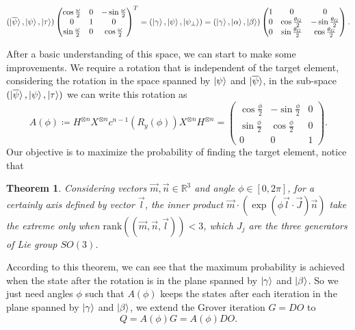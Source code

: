 \documentclass[a4paper,10pt]{book}
\newtheorem{theorem}{Theorem}[section]
\numberwithin{equation}{section}
\begin{document}
\begin{equation*}
    (\ket{\overline{\psi}},\ket{\psi},\ket{\tau})
    \begin{pmatrix}
        \cos\frac{\omega}{2} & 0 & -\sin\frac{\omega}{2} \\
        0                    & 1 & 0                     \\
        \sin\frac{\omega}{2} & 0 & \cos\frac{\omega}{2}
    \end{pmatrix}
    ^{T}=(\ket{\gamma},\ket{\psi},\ket{\psi_{\perp}})
    =(\ket{\gamma},\ket{\alpha},\ket{\beta})
    \begin{pmatrix}
        1 & 0                        & 0                         \\
        0 & \cos\frac{\theta_{G}}{2} & -\sin\frac{\theta_{G}}{2} \\
        0 & \sin\frac{\theta_{G}}{2} & \cos\frac{\theta_{G}}{2}
    \end{pmatrix}
    .
\end{equation*}


After a basic understanding of this space, we can start to make some improvements. We require a rotation that is independent of the target element, considering the rotation in the space spanned by $\ket{\psi}$ and $\ket{\overline{\psi}}$, in the sub-space $(\ket{\overline{\psi}},\ket{\psi},\ket{\tau})$ we can write this rotation as
\begin{equation}
    A(\phi)\coloneqq H^{\otimes n}X^{\otimes n}c^{n-1}\left(R_{y}(\phi)\right)X^{\otimes n}H^{\otimes n}=
    \begin{pmatrix}
        \cos\frac{\phi}{2} & -\sin\frac{\phi}{2} & 0 \\
        \sin\frac{\phi}{2} & \cos\frac{\phi}{2}  & 0 \\
        0                  & 0                   & 1
    \end{pmatrix}
    .
\end{equation}
Our objective is to maximize the probability of finding the target element, notice that
\begin{theorem}
    Considering vectors $\vec{m},\vec{n}\in\mathbb{R}^{3}$ and angle $\phi\in[0,2\pi]$, for a certainly axis defined by vector $\vec{l}$, the inner product $\vec{m}\cdot\left(\exp\left(\phi\vec{l}\cdot\vec{J}\right)\vec{n}\right)$ take the extreme only when $\mathrm{rank}\left(\left(\vec{m},\vec{n},\vec{l}\right)\right)<3$, which $J_{j}$ are the three generators of Lie group $SO(3)$.
\end{theorem}
According to this theorem, we can see that the maximum probability is achieved when the state after the rotation is in the plane spanned by $\ket{\gamma}$ and $\ket{\beta}$. So we just need angles $\phi$ such that $A(\phi)$ keeps the states after each iteration in the plane spanned by $\ket{\gamma}$ and $\ket{\beta}$, we extend the Grover iteration $G=DO$ to
\begin{equation}
    Q=A(\phi)G=A(\phi)DO.
\end{equation}
\end{document}
